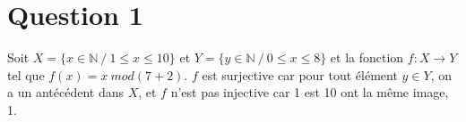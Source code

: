 \section*{Question 1}

Soit $X = \{ x \in \mathbb{N} \ / \ 1 \leq x \leq 10\}$ et   $Y = \{ y \in \mathbb{N} \ / \ 0 \leq x \leq 8\}$ et la fonction $f : X \rightarrow Y$ tel que $f(x) = x \ mod (7 + 2)$. $f$ est surjective car pour tout élément $y \in Y$, on a un antécédent dans $X$, et $f$ n’est pas injective car 1 est 10 ont la même image, 1.
